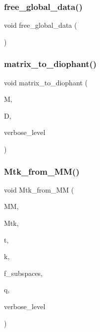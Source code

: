 \subsubsection{\texorpdfstring{free\+\_\+global\+\_\+data()}{free\_global\_data()}}
{\footnotesize\ttfamily void free\+\_\+global\+\_\+data (\begin{DoxyParamCaption}{ }\end{DoxyParamCaption})}

\mbox{\label{discreta__global_8_c_a071668912330608663604617e17cc22c}} 
\subsubsection{\texorpdfstring{matrix\+\_\+to\+\_\+diophant()}{matrix\_to\_diophant()}}
{\footnotesize\ttfamily void matrix\+\_\+to\+\_\+diophant (\begin{DoxyParamCaption}\item[{\mbox{\hyperlink{classmatrix}{matrix}} \&}]{M,  }\item[{\mbox{\hyperlink{classdiophant}{diophant}} $\ast$\&}]{D,  }\item[{\mbox{\hyperlink{galois_8h_a09fddde158a3a20bd2dcadb609de11dc}{I\+NT}}}]{verbose\+\_\+level }\end{DoxyParamCaption})}

\mbox{\label{discreta__global_8_c_afeecbc8a2b22f56f2148e646622f0c1e}} 
\subsubsection{\texorpdfstring{Mtk\+\_\+from\+\_\+\+M\+M()}{Mtk\_from\_MM()}}
{\footnotesize\ttfamily void Mtk\+\_\+from\+\_\+\+MM (\begin{DoxyParamCaption}\item[{\mbox{\hyperlink{class_vector}{Vector}} \&}]{MM,  }\item[{\mbox{\hyperlink{classmatrix}{matrix}} \&}]{Mtk,  }\item[{\mbox{\hyperlink{galois_8h_a09fddde158a3a20bd2dcadb609de11dc}{I\+NT}}}]{t,  }\item[{\mbox{\hyperlink{galois_8h_a09fddde158a3a20bd2dcadb609de11dc}{I\+NT}}}]{k,  }\item[{\mbox{\hyperlink{galois_8h_a09fddde158a3a20bd2dcadb609de11dc}{I\+NT}}}]{f\+\_\+subspaces,  }\item[{\mbox{\hyperlink{galois_8h_a09fddde158a3a20bd2dcadb609de11dc}{I\+NT}}}]{q,  }\item[{\mbox{\hyperlink{galois_8h_a09fddde158a3a20bd2dcadb609de11dc}{I\+NT}}}]{verbose\+\_\+level }\end{DoxyParamCaption})}

